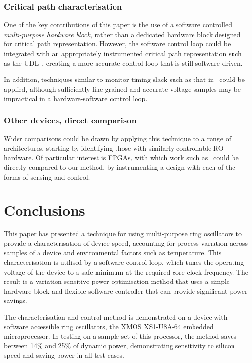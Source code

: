 \documentclass[a4paper,twocolumn,DIV=16]{scrartcl}
\begin{document}
\subsubsection*{Critical path characterisation}

One of the key contributions of this paper is the use of a software controlled
\emph{multi-purpose hardware block}, rather than a dedicated hardware block
designed for critical path representation. However, the software control loop
could be integrated with an appropriately instrumented critical path
representation such as the UDL~\cite{Ikenaga2011}, creating a more accurate
control loop that is still software driven.

In addition, techniques similar to monitor timing slack such as that
in~\cite{Hsieh2011} could be applied, although sufficiently fine grained and
accurate voltage samples may be impractical in a hardware-software control loop.

\subsubsection*{Other devices, direct comparison}

Wider comparisons could be drawn by applying this technique to a range of
architectures, starting by identifying those with similarly controllable RO
hardware. Of particular interest is FPGAs, with which work such
as~\cite{Nabina2012,Nunez-Yanez2013} could be directly compared to our method,
by instrumenting a design with each of the forms of sensing and control.

\section{Conclusions}
\label{sec:conclusions}

This paper has presented a technique for using multi-purpose ring oscillators to
provide a characterisation of device speed, accounting for process variation
across samples of a device and environmental factors such as temperature. This
characterisation is utilised by a software control loop, which tunes the
operating voltage of the device to a safe minimum at the required core clock
frequency. The result is a variation sensitive power optimisation method that
uses a simple hardware block and flexible software controller that can provide
significant power savings.

The characterisation and control method is demonstrated on a device with
software accessible ring oscillators, the XMOS XS1-U8A-64 embedded
microprocessor. In testing on a sample set of this processor, the method saves
between 14\% and 25\% of dynamic power, demonstrating sensitivity to silicon
speed and saving power in all test cases. 
\end{document}

